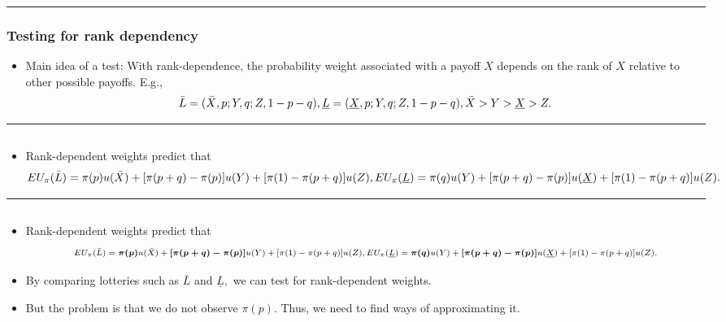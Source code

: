 \documentclass[
  letterpaper,
  DIV=11,
  numbers=noendperiod]{scrartcl}
\providecommand{\tightlist}{%
  \setlength{\itemsep}{0pt}\setlength{\parskip}{0pt}}\usepackage{longtable,booktabs,array}
\begin{document}
\begin{center}\rule{0.5\linewidth}{0.5pt}\end{center}

\subsubsection{Testing for rank
dependency}\label{testing-for-rank-dependency}

\begin{itemize}
\tightlist
\item
  Main idea of a test: With rank-dependence, the probability weight
  associated with a payoff \(X\) depends on the rank of \(X\) relative
  to other possible payoffs. E.g., \[
  \bar{L} = (\bar{X}, p; Y, q; Z, 1-p-q),\, \\ 
  \underline{L} = (\underline{X}, p; Y, q; Z, 1-p-q), \\
  \bar{X} > Y > \underline{X} > Z.
  \]
\end{itemize}

\begin{center}\rule{0.5\linewidth}{0.5pt}\end{center}

\subsection{}\label{section-12}

\begin{itemize}
\tightlist
\item
  Rank-dependent weights predict that \[
  \scriptsize
  EU_\pi(\bar{L}) = \pi(p)u(\bar{X}) + [\pi(p+q) - \pi(p)]u(Y) + [\pi(1) - \pi(p+q)]u(Z), \\
  \scriptsize
  EU_\pi(\underline{L}) = \pi(q)u(Y) + [\pi(p+q) - \pi(p)]u(\underline{X}) + [\pi(1) - \pi(p+q)]u(Z).
  \]
\end{itemize}

\begin{center}\rule{0.5\linewidth}{0.5pt}\end{center}

\subsection{}\label{section-13}

\begin{itemize}
\tightlist
\item
  Rank-dependent weights predict that \[
  \scriptsize
  EU_\pi(\bar{L}) = \boldsymbol{\pi(p)}u(\bar{X}) + \boldsymbol{[\pi(p+q) - \pi(p)]}u(Y) + [\pi(1) - \pi(p+q)]u(Z), \\
  \scriptsize
  EU_\pi(\underline{L}) = \boldsymbol{\pi(q)}u(Y) + \boldsymbol{[\pi(p+q) - \pi(p)]}u(\underline{X}) + [\pi(1) - \pi(p+q)]u(Z).
  \]
\item
  By comparing lotteries such as \(\bar{L}\) and \(\underline{L},\) we
  can test for rank-dependent weights.
\item
  But the problem is that we do not observe \(\pi(p)\). Thus, we need to
  find ways of approximating it.
\end{itemize}
\end{document}
